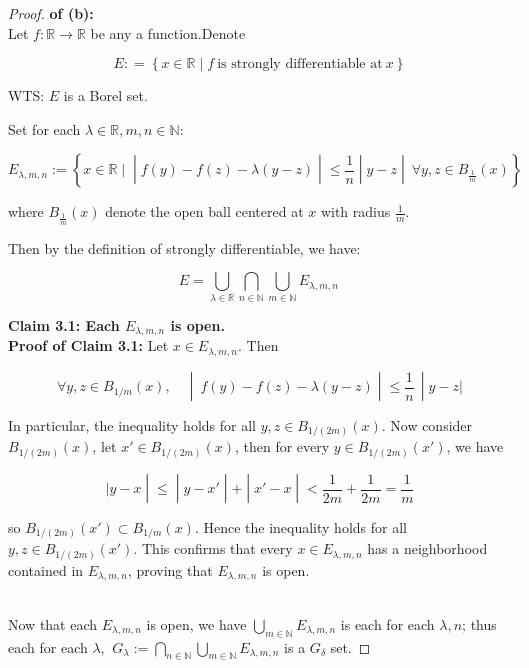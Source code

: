 \documentclass{qlnotes-export}
\begin{document}
\begin{proof}

\textbf{of (b):}\\
Let \(f:{\mathbb{R}}\rightarrow{\mathbb{R}}\) be any a function.Denote

\[E: = \left\{ {x \in {\mathbb{R}} \mid f\ \text{is strongly differentiable at}\ x} \right\}\]

WTS: \(E\) is a Borel set.

Set for each \(\lambda \in {\mathbb{R}},m,n \in {\mathbb{N}}\):

\[E_{\lambda,m,n} := \left\{ x \in {\mathbb{R}} \mid \middle| f(y) - f(z) - \lambda(y - z) \middle| \leq \frac{1}{n} \middle| y - z \middle| \ \forall y,z \in B_{\frac{1}{m}}(x) \right\}\]

where \(B_{\frac{1}{m}}(x)\) denote the open ball centered at \(x\) with radius \(\frac{1}{m}\).

Then by the definition of strongly differentiable, we have:

\[E = \bigcup\limits_{\lambda \in {\mathbb{R}}}\bigcap\limits_{n \in {\mathbb{N}}}\bigcup\limits_{m \in {\mathbb{N}}}E_{\lambda,m,n}\,\]

\textbf{Claim 3.1: Each \(E_{\lambda,m,n}\) is open.}\\
\textbf{Proof of Claim 3.1:} Let \(x \in E_{\lambda,m,n}\). Then

\[\left. \forall y,z \in B_{1/m}(x),\quad \middle| \ f(y) - f(z) - \lambda(y - z) \middle| \leq \frac{1}{n}\, \middle| y - z| \right.\]

In particular, the inequality holds for all \(y,z \in B_{1/(2m)}(x)\). Now consider \(B_{1/(2m)}(x)\), let \(x' \in B_{1/(2m)}(x)\), then for every \(y \in B_{1/(2m)}(x')\), we have

\[\left. |y - x \middle| \leq \middle| y - x' \middle| + \middle| x' - x \middle| < \frac{1}{2m} + \frac{1}{2m} = \frac{1}{m} \right.\]

so \(B_{1/(2m)}(x') \subset B_{1/m}(x)\). Hence the inequality holds for all \(y,z \in B_{1/(2m)}(x')\). This confirms that every \(x \in E_{\lambda,m,n}\) has a neighborhood contained in \(E_{\lambda,m,n}\), proving that \(E_{\lambda,m,n}\) is open.\\
\strut \\
Now that each \(E_{\lambda,m,n}\) is open, we have \(\bigcup_{m \in {\mathbb{N}}}E_{\lambda,m,n}\) is each for each \(\lambda,n\); thus each for each \(\lambda\), \(\ G_{\lambda} := \bigcap_{n \in {\mathbb{N}}}\bigcup_{m \in {\mathbb{N}}}E_{\lambda,m,n}\) is a \(G_{\delta}\) set.


\end{proof}
\end{document}
